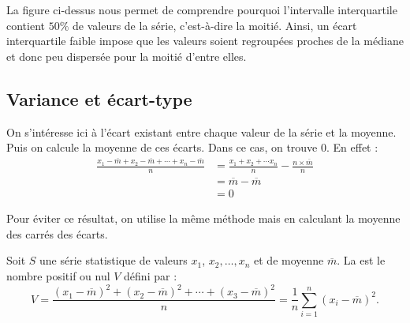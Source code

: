 \documentclass[10pt,openright,twoside,french]{book}
\begin{document}
\begin{Rmq}
\begin{center}
\end{center}

La figure ci-dessus nous permet de comprendre pourquoi l'intervalle interquartile contient $50\%$ de valeurs de la série, c'est-à-dire la moitié. Ainsi, un écart interquartile faible impose que les valeurs soient regroupées proches de la médiane et donc peu dispersée pour la moitié d'entre elles.
\end{Rmq}

\subsection{Variance et écart-type}
On s'intéresse ici à l'écart existant entre chaque valeur de la série et la moyenne. Puis on calcule la moyenne de ces écarts. Dans ce cas, on trouve $0$. En effet :
\[\begin{split}
    \frac{x_1 - \overline m + x_2 - \overline m + \cdots + x_n - \overline m}{n} &= \frac{x_1 + x_2 + \cdots x_n}{n} - \frac{n \times \overline m}{n} \\
    &= \overline m - \overline m \\
    &= 0
\end{split}\]

Pour éviter ce résultat, on utilise la même méthode mais en calculant la moyenne des carrés des écarts.

\begin{Defi}
    Soit $S$ une série statistique de valeurs $x_1$, $x_2, \ldots, x_n$ et de moyenne $\overline m$. La  est le nombre positif ou nul $V$ défini par :
    \[V = \frac{(x_1 - \overline m)^2 + (x_2 - \overline m)^2 + \cdots + (x_3 - \overline m)^2}{n} = \frac1n \sum_{i = 1}^{n}(x_i - \overline m)^2.\]
\end{Defi}
\end{document}
